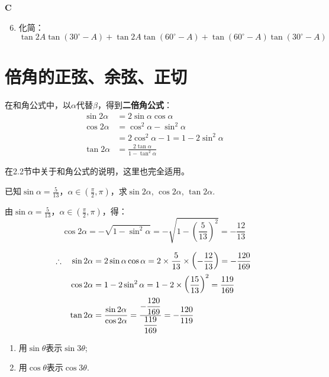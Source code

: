 \begin{center}
    \bfseries C
\end{center}

\begin{enumerate}\setcounter{enumi}{5}
    \item 化简：$$\tan2A \tan(30^{\circ}-A)+ \tan2A \tan(60^{\circ}-A) +\tan\left(60^{\circ}-A\right)\tan \left(30^{\circ}-A\right)$$
\end{enumerate}

\section{倍角的正弦、余弦、正切}
在和角公式中，以$\alpha$代替$\beta$，得到\textbf{二倍角公式}：
\begin{align}
\sin2\alpha&=2\sin\alpha\cos\alpha \nonumber\\
\cos2\alpha&=\cos^2\alpha-\sin^2\alpha\nonumber\\
&=2\cos^2\alpha-1=1-2\sin^2\alpha \tag{$\sin^2\alpha=1-\cos^2\alpha$}\\
\tan2\alpha&=\frac{2\tan\alpha}{1-\tan^2\alpha}    \nonumber
\end{align}

在2.2节中关于和角公式的说明，这里也完全适用。

\begin{example}
已知$\sin\alpha=\frac{5}{13}$，$\alpha\in\left(\frac{\pi}{2},\pi\right)$，求$\sin2\alpha$, $\cos2\alpha$, $\tan2\alpha$. 
\end{example}

\begin{solution}
    由$\sin\alpha=\frac{5}{13}$，$\alpha\in\left(\frac{\pi}{2},\pi\right)$，得：
\[\cos2\alpha=-\sqrt{1-\sin^2\alpha}=-\sqrt{1-\left(\frac{5}{13}\right)^2}=-\frac{12}{13}\]

\[\begin{split}
\therefore\quad \sin2\alpha&=2\sin\alpha\cos\alpha=2\times\dfrac{5}{13}\times\left(-\dfrac{12}{13}\right)=-\dfrac{120}{169}    \\
\cos2\alpha&=1-2\sin^2\alpha =1-2\times\left(\dfrac{15}{13}\right)^2=\dfrac{119}{169}\\
\tan2\alpha&=\dfrac{\sin2\alpha}{\cos2\alpha}=\dfrac{-\dfrac{120}{169}}{\dfrac{119}{169}}=-\dfrac{120}{119}
\end{split}\]
\end{solution}


\begin{example}
\begin{enumerate}[(1)]
    \item 用$\sin\theta$表示$\sin3\theta$;
    \item 用$\cos\theta$表示$\cos3\theta$.
\end{enumerate}
\end{example}

